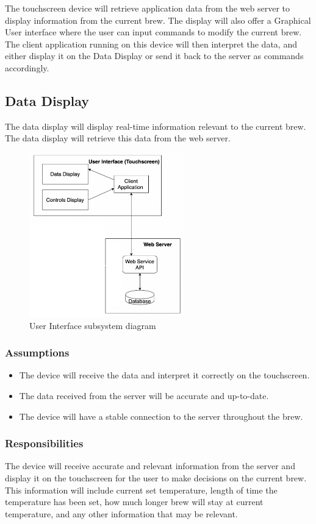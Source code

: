 The touchscreen device will retrieve application data from the web server to display information from the current brew.  The display will also offer a Graphical User interface where the user can input commands to modify the current brew. The client application running on this device will then interpret the data, and either display it on the Data Display or send it back to the server as commands accordingly.

\subsection{Data Display}
The data display will display real-time information relevant to the current brew. The data display will retrieve this data from the web server.

\begin{figure}[h!]
	\centering
 	\includegraphics[width=0.60\textwidth]{images/UI_subsystem}
 \caption{User Interface subsystem diagram}
\end{figure}

\subsubsection{Assumptions}
\begin {itemize}
\item The device will receive the data and interpret it correctly on the touchscreen.
\item The data received from the server will be accurate and up-to-date.
\item The device will have a stable connection to the server throughout the brew.
\end {itemize}


\subsubsection{Responsibilities}
The device will receive accurate and relevant information from the server and display it on the touchscreen for the user to make decisions on the current brew. This information will include current set temperature, length of time the temperature has been set, how much longer brew will stay at current temperature, and any other information that may be relevant.

